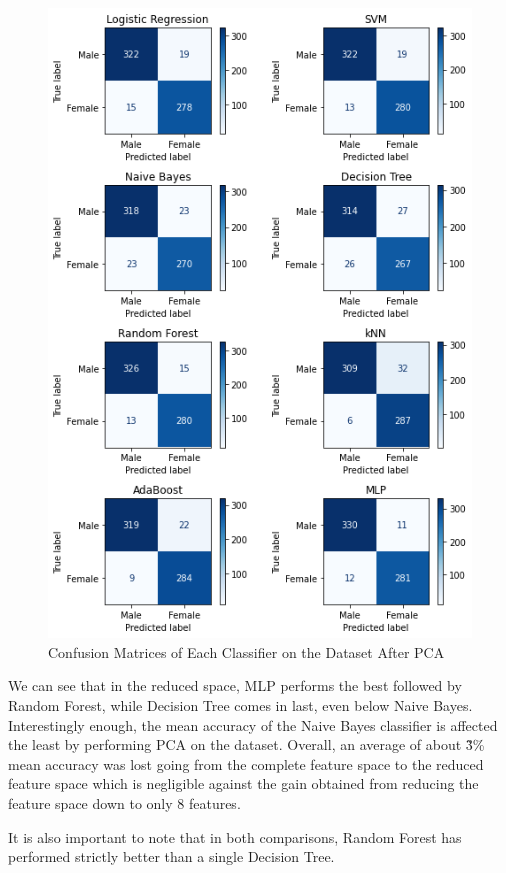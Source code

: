 \documentclass[journal,onecolumn]{IEEEtran}
\begin{document}
\begin{figure}[hbtp]
  \centering
  \includegraphics[width=0.8\linewidth]{figures/pca_conf_mats.png}
  \caption{Confusion Matrices of Each Classifier on the Dataset After PCA}
  \label{fig:pca_cm}
\end{figure}
\clearpage
We can see that in the reduced space, MLP performs the best followed by Random Forest, while
Decision Tree comes in last, even below Naive Bayes. Interestingly enough, the mean accuracy of 
the Naive Bayes classifier is affected the least by performing PCA on the dataset. Overall, an average of about \~3\% 
mean accuracy was lost going from the complete feature space to the reduced feature space which is negligible against
the gain obtained from reducing the feature space down to only 8 features.

It is also important to note that in both comparisons, Random Forest has performed strictly better than a single Decision Tree.


\end{document}
